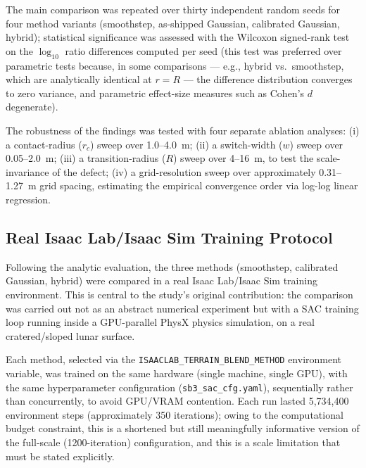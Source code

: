 The main comparison was repeated over thirty independent random seeds
for four method variants (smoothstep, as-shipped Gaussian, calibrated
Gaussian, hybrid); statistical significance was assessed with the
Wilcoxon signed-rank test on the $\log_{10}$ ratio differences computed
per seed (this test was preferred over parametric tests because, in some
comparisons --- e.g., hybrid vs.\ smoothstep, which are analytically
identical at $r=R$ --- the difference distribution converges to zero
variance, and parametric effect-size measures such as Cohen's $d$
degenerate).

The robustness of the findings was tested with four separate ablation
analyses: (i) a contact-radius ($r_c$) sweep over 1.0--4.0~m; (ii) a
switch-width ($w$) sweep over 0.05--2.0~m; (iii) a transition-radius
($R$) sweep over 4--16~m, to test the scale-invariance of the defect;
(iv) a grid-resolution sweep over approximately 0.31--1.27~m grid
spacing, estimating the empirical convergence order via log-log linear
regression.

\subsection{Real Isaac Lab/Isaac Sim Training Protocol}
\label{sec:egitimprotokolu}

Following the analytic evaluation, the three methods (smoothstep,
calibrated Gaussian, hybrid) were compared in a real Isaac Lab/Isaac Sim
training environment. This is central to the study's original
contribution: the comparison was carried out not as an abstract
numerical experiment but with a SAC training loop running inside a
GPU-parallel PhysX physics simulation, on a real cratered/sloped lunar
surface.

Each method, selected via the \texttt{ISAACLAB\_TERRAIN\_BLEND\_METHOD}
environment variable, was trained on the same hardware (single machine,
single GPU), with the same hyperparameter configuration
(\texttt{sb3\_sac\_cfg.yaml}), sequentially rather than concurrently, to
avoid GPU/VRAM contention. Each run lasted 5,734,400 environment steps
(approximately 350 iterations); owing to the computational budget
constraint, this is a shortened but still meaningfully informative
version of the full-scale (1200-iteration) configuration, and this is a
scale limitation that must be stated explicitly.

